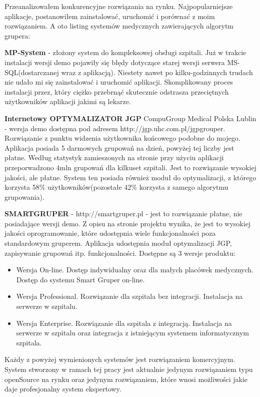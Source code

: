 Przeanalizowałem konkurencyjne rozwiązania na rynku. Najpopularniejsze aplikacje, postanowiłem zainstalować, uruchomić i porównać z moim rozwiązaniem. A oto listing systemów medycznych zawierających algorytm grupera:

\textbf{MP-System} - złożony system do kompleksowej obsługi szpitali. Już w trakcie instalacji wersji demo pojawiły się błędy dotyczące starej wersji serwera MS-SQL(dostarczanej wraz z aplikacją). Niestety nawet po kilku-godzinnych trudach nie udało mi się zainstalować i uruchomić aplikacji. Skomplikowany proces instalacji przez, który ciężko przebrnąć skutecznie odstrasza przeciętnych użytkowników aplikacji jakimi są lekarze.

\textbf{Internetowy OPTYMALIZATOR JGP} CompuGroup Medical Polska Lublin - wersja demo dostępna pod adresem http://jgp.uhc.com.pl/jgpgrouper.
Rozwiązanie z punktu widzenia użytkownika końcowego podobne do mojego. Aplikacja posiada 5 darmowych grupowań na dzień, powyżej tej liczby jest płatne. Według statystyk zamieszonych na stronie przy użyciu aplikacji przeporwadzono 4mln grupowań dla kilkuset szpitali. Jest to rozwiązanie wysokiej jakości, ale płatne.
System ten posiada również moduł do optymalizacji, z którego korzysta 58\% użytkowników(pozostałe 42\% korzysta z samego algorytmu grupowania).

\textbf{SMARTGRUPER} - http://smartgruper.pl - jest to rozwiązanie płatne, nie posiadające wersji demo. Z opisu na stronie projektu wynika, że jest to wysokiej jakości oprogramowanie, które udostępnia wiele funkcjonalności poza standardowym gruperem. Aplikacja udostępnia moduł optymalizacji JGP, zapisywanie grupowań itp. funkcjonalności. Dostępne są 3 wersje produktu:
\begin{itemize}
 \item Wersja On-line. Dostęp indywidualny oraz dla małych placówek medycznych. Dostęp do systemu Smart Gruper on-line.
 \item Wersja Professional. Rozwiązanie dla szpitala bez integracji. Instalacja na serwerze w szpitalu.
 \item Wersja Enterprise. Rozwiązanie dla szpitala z integracją. Instalacja na serwerze w szpitalu oraz integracja z istniejącym systemem informatycznym szpitala.
\end{itemize}

Każdy z powyżej wymienionych systemów jest rozwiązaniem komercyjnym. System stworzony w ramach tej pracy jest aktualnie jedynym rozwiązaniem typu openSource na rynku oraz jedynym rozwiązaniem, które wnosi możliwości jakie daje profesjonalny system ekspertowy.

